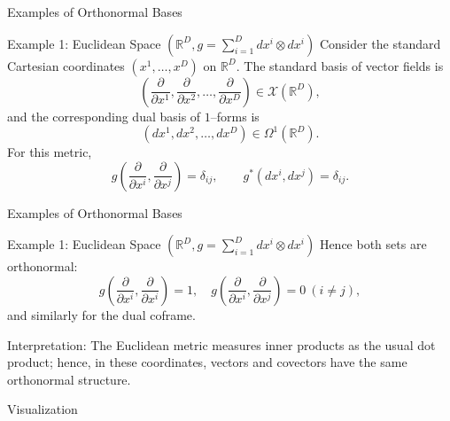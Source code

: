 \begin{frame}{Examples of Orthonormal Bases}
\begin{block}{Example 1: Euclidean Space \((\mathbb{R}^D,g=\sum_{i=1}^{D}dx^i\otimes dx^i)\)}
Consider the standard Cartesian coordinates $(x^1,\dots,x^D)$ on $\mathbb{R}^D$.
The standard basis of vector fields is
\[
\left(\frac{\partial}{\partial x^1},\frac{\partial}{\partial x^2},\dots,\frac{\partial}{\partial x^D}\right)
\in\mathcal{X}(\mathbb{R}^D),
\]
and the corresponding dual basis of $1$–forms is
\[
(dx^1,dx^2,\dots,dx^D)\in\Omega^1(\mathbb{R}^D).
\]
For this metric,
\[
g\!\left(\frac{\partial}{\partial x^i},\frac{\partial}{\partial x^j}\right)
=\delta_{ij},\qquad
g^*(dx^i,dx^j)=\delta_{ij}.
\]
\end{block}
\end{frame}


\begin{frame}{Examples of Orthonormal Bases}
\begin{block}{Example 1: Euclidean Space \((\mathbb{R}^D,g=\sum_{i=1}^{D}dx^i\otimes dx^i)\)}
Hence both sets are orthonormal:
\[
g\left(\frac{\partial}{\partial x^i},\frac{\partial}{\partial x^i}\right)=1,
\quad
g\left(\frac{\partial}{\partial x^i},\frac{\partial}{\partial x^j}\right)=0\ (i\ne j),
\]
and similarly for the dual coframe.
\end{block}

\begin{block}{Interpretation:}
The Euclidean metric measures inner products as the usual dot product; hence, in these coordinates, vectors and covectors have the same orthonormal structure.
\end{block}
\end{frame}


\begin{frame}{Visualization}
    \begin{center}
\end{center}
\end{frame}

